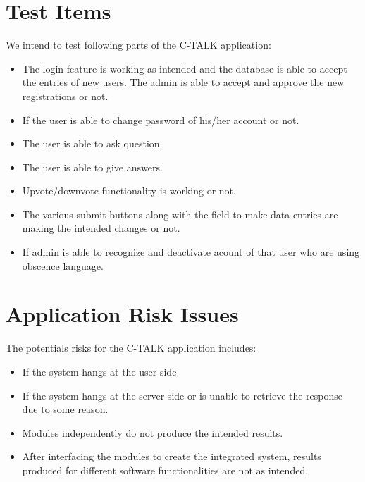 \documentclass[12pt]{article}
\begin{document}
\section{Test Items}
We intend to test following parts of the C-TALK application:\\
\begin{itemize}
    

    \item The login feature is working as intended and the database is able to accept the entries of new users. The admin is able to accept and approve the new registrations or not.
    \item If the user is able to change password of his/her account or not.
    \item The user is able to ask question.
    \item The user is able to give answers.
    \item Upvote/downvote functionality is working or not.
    \item The various submit buttons along with the field to make data entries are making the intended changes or not.
    \item If admin is able to recognize  and deactivate acount of that user who are using obscence language.
\end{itemize}
\section{Application Risk Issues}
The potentials risks for the  C-TALK application includes:\\
\begin{itemize}
    
    \item If the system hangs at the user side
    \item If the system hangs at the server side or is unable to retrieve the response due to some reason.
    \item Modules independently do not produce the intended results.
    \item After interfacing the modules to create the integrated system, results produced for different software functionalities are not as intended.
\end{itemize}
\end{document}
